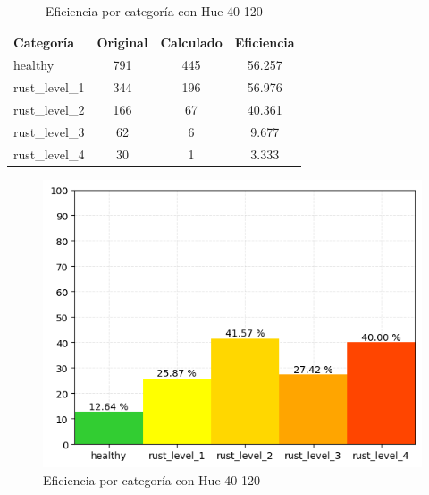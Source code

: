 \captionsetup[figure]{skip=10pt}

\begin{table}[h!]
\centering
\begin{tabular}{|l|c|c|c|}
\hline 
\textbf{Categoría} & \textbf{Original} & \textbf{Calculado} & \textbf{Eficiencia} \\
\hline
healthy & 791 & 445 & 56.257 \\
\hline 
rust\_level\_1 & 344 & 196 & 56.976 \\
\hline 
rust\_level\_2 & 166 & 67 & 40.361 \\
\hline 
rust\_level\_3 & 62 & 6 & 9.677 \\
\hline 
rust\_level\_4 & 30 & 1 & 3.333 \\
\hline 
\end{tabular}
\caption{Eficiencia por categoría con Hue 40-120}
\label{table:efficiency_categories_40_120}
\end{table}

\begin{figure}[H]
\centering
\includegraphics[scale=0.6]{images/result_classes_40_120.png}
\caption{Eficiencia por categoría con Hue 40-120}
\label{img:efficiency_categories_40_120}
\end{figure}
